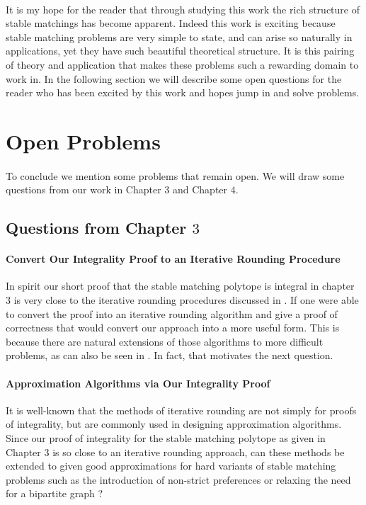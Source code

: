 \paragraph{}
It is my hope for the reader that through studying this work the rich structure of stable matchings has become apparent. Indeed this work is exciting because stable matching problems are very simple to state, and can arise so naturally in applications, yet they have such beautiful theoretical structure. It is this pairing of theory and application that makes these problems such a rewarding domain to work in. In the following section we will describe some open questions for the reader who has been excited by this work and hopes jump in and solve problems. 

\section{Open Problems}

\paragraph{}
To conclude we mention some problems that remain open. We will draw some questions from our work in Chapter $3$ and Chapter $4$.
\subsection{Questions from Chapter $3$}

\paragraph{Convert Our Integrality Proof to an Iterative Rounding Procedure}
In spirit our short proof that the stable matching polytope is integral in chapter 3 is very close to the iterative rounding procedures discussed in \cite{lau2011iterative}. If one were able to convert the proof into an iterative rounding algorithm and give a proof of correctness that would convert our approach into a more useful form. This is because there are natural extensions of those algorithms to more difficult problems, as can also be seen in \cite{lau2011iterative}. In fact, that motivates the next question.

\paragraph{Approximation Algorithms via Our Integrality Proof}
It is well-known that the methods of iterative rounding are not simply for proofs of integrality, but are commonly used in designing approximation algorithms\cite{lau2011iterative}. Since our proof of integrality for the stable matching polytope as given in Chapter $3$ is so close to an iterative rounding approach, can these methods be extended to given good approximations for hard variants of stable matching problems such as the introduction of non-strict preferences or relaxing the need for a bipartite graph \cite{iwama2008survey}?

